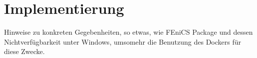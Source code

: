 \chapter{Implementierung}
\label{cha:A}

Hinweise zu konkreten Gegebenheiten, so etwas, wie FEniCS Package und dessen Nichtverfügbarkeit unter Windows, umsomehr die Benutzung des Dockers für diese Zwecke. 
